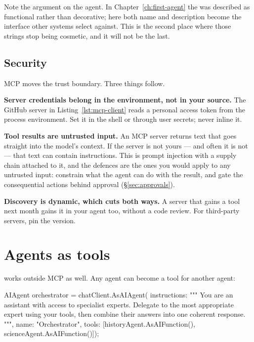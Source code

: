Note the  argument on the agent. In
Chapter~\ref{ch:first-agent} the  was described as functional rather
than decorative; here both name and description become the interface other
systems select against. This is the second place where those strings stop being
cosmetic, and it will not be the last.

\subsection{Security}

MCP moves the trust boundary. Three things follow.

\textbf{Server credentials belong in the environment, not in your source.} The
GitHub server in Listing~\ref{lst:mcp-client} reads a personal access token from
the process environment. Set it in the shell or through user secrets; never
inline it.

\textbf{Tool results are untrusted input.} An MCP server returns text that goes
straight into the model's context. If the server is not yours --- and often it is
not --- that text can contain instructions. This is prompt injection with a
supply chain attached to it, and the defences are the ones you would apply to any
untrusted input: constrain what the agent can do with the result, and gate the
consequential actions behind approval (\S\ref{sec:approvals}).

\textbf{Discovery is dynamic, which cuts both ways.} A server that gains a tool
next month gains it in your agent too, without a code review. For third-party
servers, pin the version.

\section{Agents as tools}
\label{sec:agents-as-tools}

 works outside MCP as well. Any agent can become a tool for
another agent:

\begin{csharp}[caption={An orchestrator delegating to specialists}, label={lst:agent-as-tool}]
AIAgent orchestrator = chatClient.AsAIAgent(
    instructions: """
        You are an assistant with access to specialist experts.
        Delegate to the most appropriate expert using your tools,
        then combine their answers into one coherent response.
        """,
    name: "Orchestrator",
    tools: [historyAgent.AsAIFunction(), scienceAgent.AsAIFunction()]);
\end{csharp}

